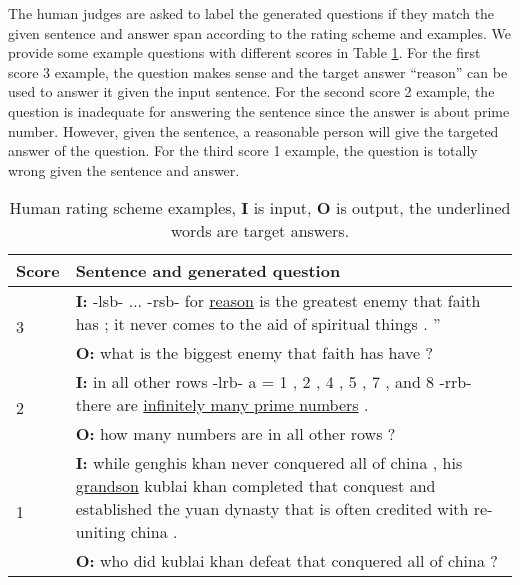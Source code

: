 \documentclass[11pt,letterpaper]{article}
\begin{document}
The human judges are asked to label the generated questions if they match the given sentence and answer span according to the rating scheme and examples.
We provide some example questions with different scores in Table \ref{tbl:humanEvaExample}.
For the first score 3 example, the question makes sense and the target answer ``reason'' can be used to answer it given the input sentence.
For the second score 2 example, the question is inadequate for answering the sentence since the answer is about prime number.
However, given the sentence, a reasonable person will give the targeted answer of the question.
For the third score 1 example, the question is totally wrong given the sentence and answer.

\begin{table}[htbp]
	\begin{center}
		\centering
		\begin{tabular}{lp{}}
			\toprule
			Score &  Sentence and generated question \\
			\midrule
			\multirow{2}{*}{3} & \textbf{I:} -lsb- ... -rsb- for \underline{reason} is the greatest enemy that faith has ; it never comes to the aid of spiritual things . ''\\
		 	& 	\textbf{O:} what is the biggest enemy that faith has have ? \\
			\hline
			\multirow{2}{*}{2} & \textbf{I:}  in all other rows -lrb- a = 1 , 2 , 4 , 5 , 7 , and 8 -rrb- there are \underline{infinitely many prime numbers} . \\
			 & \textbf{O:} how many numbers are in all other rows ? \\
			\hline
			\multirow{2}{*}{1} & \textbf{I:}  while genghis khan never conquered all of china , his \underline{grandson} kublai khan completed that conquest and established the yuan dynasty that is often credited with re-uniting china .\\
			& \textbf{O:} who did kublai khan defeat that conquered all of china ?\\
			\bottomrule
		\end{tabular}
	\end{center}
	\caption{\label{tbl:humanEvaExample} Human rating scheme examples, \textbf{I} is input, \textbf{O} is output, the underlined words are target answers.}
\end{table}

 
\end{document}
